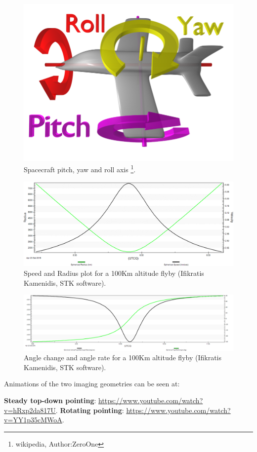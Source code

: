 \begin{figure}[htb!]
\centering
\includegraphics[scale=0.7]{figures/Orbiter/axis_o.png}
\caption[Spacecraft pitch, yaw and roll axis]{Spacecraft pitch, yaw and roll axis \footnote{wikipedia, Author:ZeroOne}.}
\label{axis_o}
\end{figure}

\begin{figure}[htb!]
\centering
\includegraphics[width=\textwidth]{figures/Orbiter/flybyspeed.png}
\caption{Speed and Radius plot for a 100Km altitude flyby (Ifikratis Kamenidis, STK software).}
\label{flybyspeed}
\end{figure}

\begin{figure}[htb!]
\centering
\includegraphics[width=\textwidth]{figures/Orbiter/anglerate2.png}
\caption{Angle change and angle rate for a 100Km altitude flyby (Ifikratis Kamenidis, STK software).}
\label{flybyangle}
\end{figure}

Animations of the two imaging geometries can be seen at:

\textbf{Steady top-down pointing}: \url{https://www.youtube.com/watch?v=hRxp2da817U}.
\textbf{Rotating pointing}: \url{https://www.youtube.com/watch?v=YY1p35cMWoA}.



